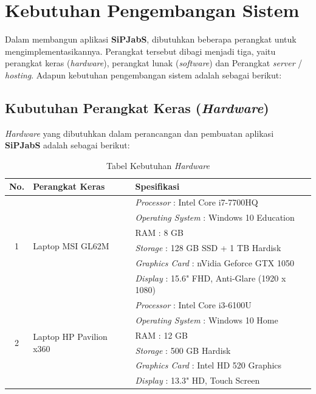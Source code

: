 \newpage
\section{Kebutuhan Pengembangan Sistem}

Dalam membangun aplikasi \textbf{SiPJabS}, dibutuhkan beberapa perangkat untuk mengimplementasikannya. Perangkat tersebut dibagi menjadi tiga, yaitu perangkat keras (\textit{hardware}), perangkat lunak (\textit{software}) dan Perangkat \textit{server} / \textit{hosting}. Adapun kebutuhan pengembangan sistem adalah sebagai berikut: 

\subsection{Kubutuhan Perangkat Keras (\textit{Hardware}) }

\textit{Hardware} yang dibutuhkan dalam perancangan dan pembuatan aplikasi \textbf{SiPJabS}
adalah sebagai berikut:


\begin{table}[H]
	\centering
	\caption{Tabel Kebutuhan \textit{Hardware}}
	\begin{tabular}{ | c | l | p{75mm} | }
		\hline
		No. & Perangkat Keras & Spesifikasi \\
		\hline
		\multirow{6}{*}{1} & \multirow{6}{*}{Laptop MSI GL62M} & \textit{Processor} : Intel Core i7-7700HQ \\
		& & \textit{Operating System} : Windows 10 Education \\
		& & RAM : 8 GB \\
		& & \textit{Storage} : 128 GB SSD + 1 TB Hardisk \\
		& & \textit{Graphics Card} :  nVidia Geforce GTX 1050 \\
		& & \textit{Display} : 15.6" FHD, Anti-Glare (1920 x 1080) \\
		
		
		\hline
		
		\multirow{6}{*}{2} & \multirow{6}{*}{Laptop HP Pavilion x360} & \textit{Processor} : Intel Core i3-6100U \\
		& & \textit{Operating System} : Windows 10 Home \\
		& & RAM : 12 GB \\
		& & \textit{Storage} : 500 GB Hardisk\\
		& & \textit{Graphics Card} : Intel HD 520 Graphics \\
		& & \textit{Display} : 13.3" HD, Touch Screen \\
		
		\hline
	\end{tabular}
\end{table}


